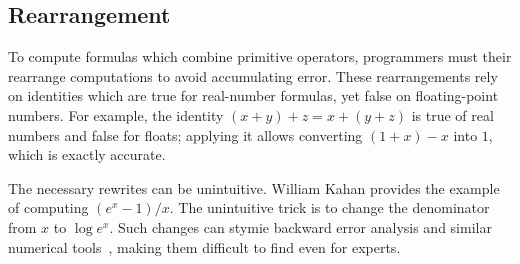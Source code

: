 \documentclass[paper.tex]{subfiles}
\begin{document}
\subsection{Rearrangement}

To compute formulas which combine primitive operators,
  programmers must their rearrange computations
  to avoid accumulating error.
These rearrangements rely on identities which are
  true for real-number formulas, yet false on floating-point numbers.
For example, the identity $(x + y) + z = x + (y + z)$
  is true of real numbers and false for floats;
  applying it allows converting $(1 + x) - x$ into $1$,
  which is exactly accurate.

The necessary rewrites can be unintuitive.  William Kahan provides the
example~\cite{kahan-java-hurts} of computing $(e^x - 1) / x$.
The unintuitive trick is to change the denominator from $x$ to $\log e^x$.
Such changes can stymie backward error analysis
  and similar numerical tools~\cite{kahan-java-hurts},
  making them difficult to find even for experts.
\end{document}
